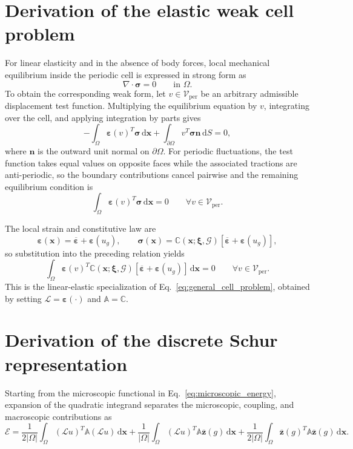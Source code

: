 \documentclass[pdflatex,sn-basic,Numbered]{sn-jnl}
\newcommand{\G}{\mathcal{G}}
\begin{document}
\section{Derivation of the elastic weak cell problem}
\label{app:weak_form_derivation}

For linear elasticity and in the absence of body forces, local mechanical
equilibrium inside the periodic cell is expressed in strong form as
\[
\nabla\!\cdot\!\boldsymbol\sigma=0
\qquad
\text{in }\Omega.
\]
To obtain the corresponding weak form, let
\(v\in\mathcal V_{\mathrm{per}}\) be an arbitrary admissible displacement
test function. Multiplying the equilibrium equation by \(v\), integrating
over the cell, and applying integration by parts gives
\[
-\int_{\Omega}
\boldsymbol\varepsilon(v)^T
\boldsymbol\sigma
\,\mathrm{d}\boldsymbol x
+
\int_{\partial\Omega}
v^T
\boldsymbol\sigma\boldsymbol n
\,\mathrm{d}S
=
0,
\]
where \(\boldsymbol n\) is the outward unit normal on
\(\partial\Omega\). For periodic fluctuations, the test function takes equal
values on opposite faces while the associated tractions are anti-periodic, so
the boundary contributions cancel pairwise and the remaining equilibrium
condition is
\[
\int_{\Omega}
\boldsymbol\varepsilon(v)^T
\boldsymbol\sigma
\,\mathrm{d}\boldsymbol x
=
0
\qquad
\forall v\in\mathcal V_{\mathrm{per}}.
\]

The local strain and constitutive law are
\[
\boldsymbol\varepsilon(\boldsymbol x)
=
\overline{\boldsymbol\varepsilon}
+
\boldsymbol\varepsilon(u_g),
\qquad
\boldsymbol\sigma(\boldsymbol x)
=
\mathbb C(\boldsymbol x;\boldsymbol\xi,\G)
\left[
\overline{\boldsymbol\varepsilon}
+
\boldsymbol\varepsilon(u_g)
\right],
\]
so substitution into the preceding relation yields
\[
\int_{\Omega}
\boldsymbol\varepsilon(v)^T
\mathbb C(\boldsymbol x;\boldsymbol\xi,\G)
\left[
\overline{\boldsymbol\varepsilon}
+
\boldsymbol\varepsilon(u_g)
\right]
\,\mathrm{d}\boldsymbol x
=
0
\qquad
\forall v\in\mathcal V_{\mathrm{per}}.
\]
This is the linear-elastic specialization of
Eq.~\eqref{eq:general_cell_problem}, obtained by setting
\(\mathcal L=\boldsymbol\varepsilon(\cdot)\) and
\(\mathbb A=\mathbb C\).

\section{Derivation of the discrete Schur representation}
\label{app:schur_derivation}

Starting from the microscopic functional in
Eq.~\eqref{eq:microscopic_energy}, expansion of the quadratic integrand
separates the microscopic, coupling, and macroscopic contributions as
\[
\mathcal E
=
\frac{1}{2|\Omega|}
\int_{\Omega}
(\mathcal L u)^T\mathbb A(\mathcal L u)
\,\mathrm d\boldsymbol x
+
\frac{1}{|\Omega|}
\int_{\Omega}
(\mathcal L u)^T\mathbb A\overline{\boldsymbol z}(g)
\,\mathrm d\boldsymbol x
+
\frac{1}{2|\Omega|}
\int_{\Omega}
\overline{\boldsymbol z}(g)^T
\mathbb A
\overline{\boldsymbol z}(g)
\,\mathrm d\boldsymbol x.
\]
\end{document}

